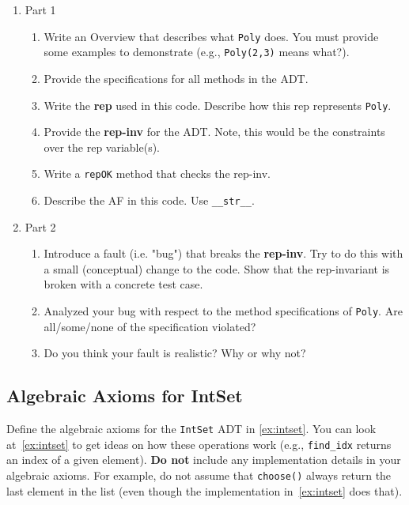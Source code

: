 \documentclass[oneside,11pt,dvipsnames]{book}
\newcommand{\code}[1]{\texttt{#1}}
\begin{document}
\begin{enumerate}
        \item Part 1
\begin{enumerate}
\item Write an Overview that describes what \code{Poly} does. You must provide some examples to demonstrate (e.g., \code{Poly(2,3)} means what?).
\item Provide the specifications for all methods in the ADT. 
\item Write the \textbf{rep} used in this code.  Describe how this rep represents \code{Poly}.
\item Provide the \textbf{rep-inv} for the ADT. Note, this would be the constraints over the rep variable(s).
\item Write a \code{repOK} method that checks the rep-inv.
\item Describe the AF in this code. Use \code{\_\_str\_\_}.
\end{enumerate}

        \item Part 2
\begin{enumerate}
        \item Introduce a fault (i.e. "bug") that breaks the \textbf{rep-inv}. Try to do this with a small (conceptual) change to the code. Show that the rep-invariant is broken with a concrete test case.
        \item Analyzed your bug with respect to the method specifications of \code{Poly}. Are all/some/none of the specification violated?
        \item Do you think your fault is realistic? Why or why not?
\end{enumerate}
        
\end{enumerate}



\subsection{Algebraic Axioms for IntSet}\label{ex:algebraic-intset}

Define the algebraic axioms for the \code{IntSet} ADT in \autoref{ex:intset}. You can look at~\autoref{ex:intset} to get ideas on how these operations work (e.g., \code{find\_idx} returns an index of a given element). \textbf{Do not} include any implementation details in your algebraic axioms. For example, do not assume that \code{choose()} always return the last element in the list (even though the implementation in~\autoref{ex:intset} does that).
\end{document}
